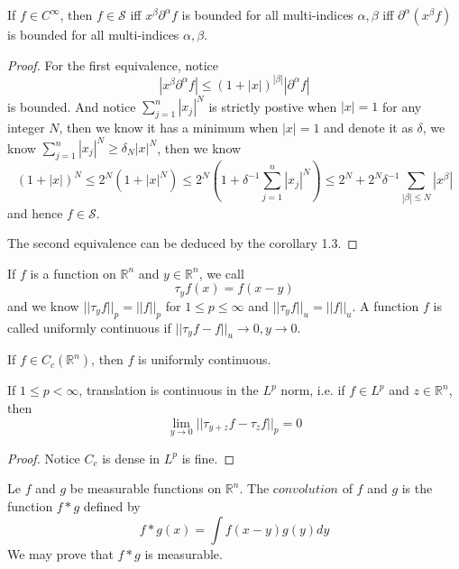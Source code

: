 \documentclass[lang=en, color=blue, ]{elegantbook}
\newcommand{\R}{\mathbb{R}}
\newcommand{\Sch}{\mathcal{S}}
\begin{document}
\begin{proposition}
    If $f\in C^{\infty}$, then $f\in\Sch$ iff $x^{\beta}\partial^{\alpha} f$ is bounded for all multi-indices $\alpha,\beta$ iff $\partial^{\alpha}(x^{\beta}f)$ is bounded for all multi-indices $\alpha,\beta$.
\end{proposition}
\begin{proof}\par
    For the first equivalence, notice
    \[
    |x^{\beta}\partial^{\alpha} f| \leq (1+|x|)^{|\beta|}|\partial^{\alpha} f| 
    \]
    is bounded. And notice $\sum\limits_{j=1}^n |x_j|^N$ is strictly postive when $|x|=1$ for any integer $N$, then we know it has a minimum when $|x|=1$ and denote it as $\delta$, we know $\sum\limits_{j=1}^n |x_j|^N \ge \delta_N |x|^N$, then we know
    \[
    (1+|x|)^N \leq 2^N(1+|x|^N) \leq 2^N(1+\delta^{-1}\sum\limits_{j=1}^n |x_j|^N) \leq 2^N + 2^N\delta^{-1}\sum\limits_{|\beta|\leq N}|x^{\beta}|
    \]
    and hence $f\in\Sch$.\par
    The second equivalence can be deduced by the corollary 1.3.
\end{proof}

\begin{definition}
    If $f$ is a function on $\R^n$ and $y\in\R^n$, we call
    \[
    \tau_yf(x) = f(x-y)
    \] 
    and we know $||\tau_y f||_p = ||f||_p$ for $1\leq p \leq \infty$ and $||\tau_y f||_u = ||f||_u$. A function $f$ is called uniformly continuous if $||\tau_y f - f||_u \to 0, y\to 0$.
\end{definition}

\begin{lemma}
    If $f\in C_c(\R^n)$, then $f$ is uniformly continuous.
\end{lemma}

\begin{proposition}
    If $1\leq p < \infty$, translation is continuous in the $L^p$ norm, i.e. if $f\in L^p$ and $z\in\R^n$, then \[\lim_{y\to 0} ||\tau_{y+z}f-\tau_z f||_p = 0\]
\end{proposition}
\begin{proof}\par
    Notice $C_c$ is dense in $L^p$ is fine.
\end{proof}

\begin{definition}
    Le $f$ and $g$ be measurable functions on $\R^n$. The $convolution$ of $f$ and $g$ is the function $f*g$ defined by
    \[f*g(x) = \int f(x-y)g(y)dy\]
    We may prove that $f*g$ is measurable.
\end{definition}
\end{document}

